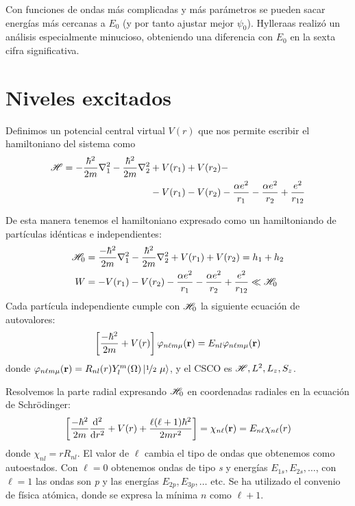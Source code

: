Con funciones de ondas más complicadas y más parámetros se pueden
sacar energías más cercanas a $E_0$ (y por tanto ajustar mejor
$\psi_0$). Hylleraas realizó un análisis especialmente
minucioso, obteniendo una diferencia con $E_0$ en la sexta cifra significativa.

\section{Niveles excitados}
Definimos un potencial central virtual $V(r)$ que nos permite escribir
el hamiltoniano del sistema como
\begin{equation}
  \begin{split}
     \mathscr{H}  = -\frac{\hbar^2}{2m}\nabla_1^2 -
      \frac{\hbar^2}{2m}\nabla_2^2 &+ V(r_1) + V(r_2)
    - \\
    &- V(r_1) - V(r_2) - \frac{\alpha e^2}{r_1} - \frac{\alpha
      e^2}{r_2} + \frac{e^{2}}{r_{12}} 
  \end{split}
\end{equation}

De esta manera tenemos el hamiltoniano expresado como un hamiltoniando
de partículas idénticas e independientes: 
\begin{align}
 \mathscr{H} _0 &= \frac{-\hbar^2}{2m}\nabla_1^2 - \frac{\hbar^2}{2m} \nabla_2^2 + V(r_1)
+ V(r_2) = h_1+h_2 \\
                W &=  - V(r_1) - V(r_2) - \frac{\alpha e^2}{r_1} - \frac{\alpha
      e^2}{r_2} + \frac{e^{2}}{r_{12}} \ll  \mathscr{H} _0
\end{align}
Cada partícula independiente cumple con $ \mathscr{H} _0$ la siguiente
ecuación de autovalores:
\begin{equation}
  \left[ \frac{-\hbar^2}{2m} + V(r) \right] \varphi_{n\ell m\mu}(\bm{\mathrm{r}})
  = E_{nl} \varphi_{n\ell m\mu}(\bm{\mathrm{r}})
\end{equation}
donde $\varphi_{n\ell m\mu}(\bm{\mathrm{r}}) = R_{nl}(r) Y_l^m(\Omega)\ket{{\nicefrac{1}{2}}\
  \mu}$, y el CSCO es $ \mathscr{H} ,L^2,L_z,S_z$.

Resolvemos la parte radial expresando $ \mathscr{H} _0$ en coordenadas
radiales en la ecuación de Schrödinger:
\begin{equation}
  \left[ \frac{-\hbar^2}{2m} \dv[2]{r} + V(r) + \frac{\ell (\ell+1)
      \hbar^2}{2mr^2}\right] = \chi_{n\ell}(\bm{\mathrm{r}}) = E_{n\ell} \chi_{n\ell}(r)
\end{equation}
donde $\chi_{nl} = r R_{nl}$. El valor de $\ell$ cambia el tipo de
ondas que obtenemos como autoestados. Con $\ell =0$ obtenemos ondas de
tipo \emph{s} y energías $E_{1s},E_{2s},\ldots$, con $\ell = 1$ las
ondas son \emph{p} y las energías $E_{2p},E_{3p},\ldots$ etc. Se ha utilizado
el convenio de física atómica, donde se expresa la mínima $n$ como
$\ell +1$.

